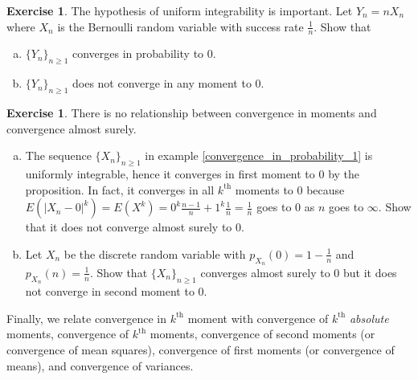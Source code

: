 \documentclass[12pt]{amsart}
\theoremstyle{definition}
\newtheorem{exercise}[theorem]{Exercise}
\begin{document}
\begin{exercise} \label{convergencein1stmomentconvergence_in_probability_1} The hypothesis of uniform integrability is important. Let $Y_n = nX_n$ where $X_n$ is the Bernoulli random variable with success rate $\frac{1}{n}$. Show that
\begin{enumerate}[a.]
\item $\{Y_n\}_{n \geq 1}$ converges in probability to 0.
\item $\{Y_n\}_{n \geq 1}$ does not converge in any moment to 0. 
\end{enumerate}
\end{exercise}

\begin{exercise} \label{convergenceinmomentsconvergencealmostsurely} There is no relationship between convergence in moments and convergence almost surely.
\begin{enumerate}[a.]
\item The sequence $\{X_n\}_{n \geq 1}$ in example \ref{convergence_in_probability_1} is uniformly integrable, hence it converges in first moment to 0 by the proposition. In fact, it converges in all $k^{\text{th}}$ moments to 0 because $E(|X_n - 0|^k) = E(X^k) = 0^k \frac{n-1}{n} + 1^k \frac{1}{n} = \frac{1}{n}$ goes to 0 as $n$ goes to $\infty$. Show that it does not converge almost surely to 0.
\item Let $X_n$ be the discrete random variable with $p_{X_n}(0) = 1 - \frac{1}{n}$ and $p_{X_n}(n) = \frac{1}{n}$.
Show that $\{X_n\}_{n \geq 1}$ converges almost surely to 0 but it does not converge in second moment to 0.
\end{enumerate}
\end{exercise}

Finally, we relate convergence in $k^{\text{th}}$ moment with convergence of $k^{\text{th}}$ \textit{absolute} moments, convergence of $k^{\text{th}}$ moments, convergence of second moments (or convergence of mean squares), convergence of first moments (or convergence of means), and convergence of variances.
\end{document}
